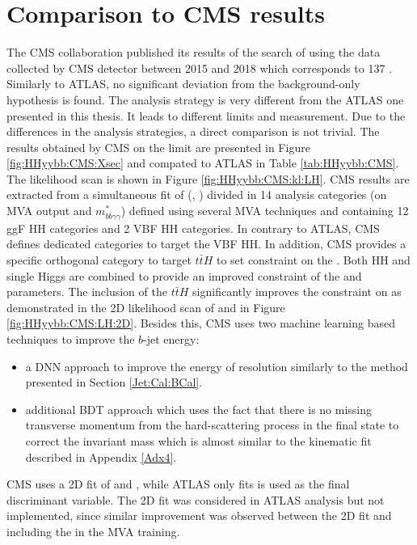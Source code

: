 \section{Comparison to CMS \HHyybb results}
\label{HHyybb:CMS}
The CMS collaboration published its results of the search of \HHyybb using the data collected by CMS detector between 2015 and 2018 which corresponds to 137 \ifb \cite{CMS_yybb}. Similarly to ATLAS, no significant deviation from the background-only hypothesis is found. The analysis strategy is very different from the ATLAS one presented in this thesis. It leads to different limits and \kl measurement. Due to the differences in the analysis strategies, a direct comparison is not trivial. The results obtained by CMS on the limit are presented in Figure \ref{fig:HHyybb:CMS:Xsec} and compated to ATLAS in Table \ref{tab:HHyybb:CMS}. The \kl likelihood scan is shown in Figure \ref{fig:HHyybb:CMS:kl:LH}. CMS results are extracted from a simultaneous fit of (\myy , \mbb) divided in 14 analysis categories (on MVA output and $m_{b \bar{b} \gamma \gamma}^{*}$) defined using several MVA techniques and containing 12 ggF HH categories and 2 VBF HH categories. In contrary to ATLAS, CMS defines dedicated categories to target the VBF HH. In addition, CMS provides a specific orthogonal category to target $t\bar{t}H$ to set constraint on the \kt. Both HH and single Higgs are combined to provide an improved constraint of the \kl and \kt parameters. The inclusion of the $t\bar{t}H$ significantly improves the constraint on \kt as demonstrated in the 2D likelihood scan of \kl and \kt in Figure \ref{fig:HHyybb:CMS:LH:2D}. Besides this, CMS uses two machine learning based techniques to improve the $b$-jet energy:
\begin{itemize}
    \item a DNN approach to improve the energy of resolution similarly to the method presented in Section \ref{Jet:Cal:BCal}.
    \item additional BDT approach which uses the fact that there is no missing transverse momentum from the hard-scattering process in the \HHyybb final state to correct the \mbb invariant mass which is almost similar to the kinematic fit described in Appendix \ref{Adx4}.
\end{itemize}
CMS uses a 2D fit of \myy and \mbb, while ATLAS only fits \myy is used as the final discriminant variable. The 2D fit was considered in ATLAS analysis but not implemented, since similar improvement was observed between the 2D fit and including the \mbb in the MVA training.

